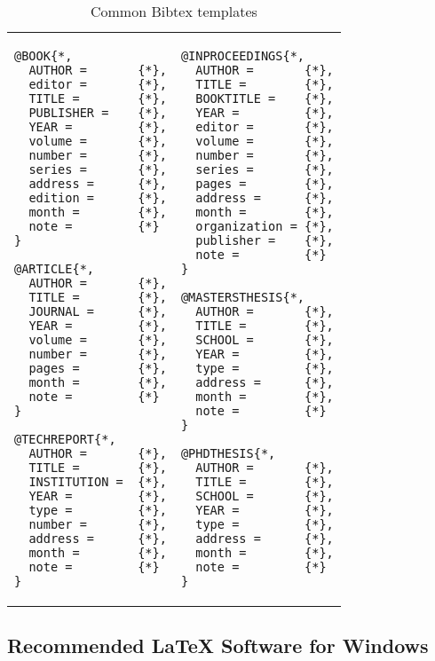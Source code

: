 \documentclass[10pt,a4paper,twoside,twocolumn]{article}
\begin{document}
\begin{table}
\newcommand{\mybibtabwidth}{0.45\columnwidth}
{\scriptsize
\begin{tabular}{ll}
  \begin{minipage}{\mybibtabwidth}
  \begin{verbatim}
@BOOK{*,
  AUTHOR =       {*},
  editor =       {*},
  TITLE =        {*},
  PUBLISHER =    {*},
  YEAR =         {*},
  volume =       {*},
  number =       {*},
  series =       {*},
  address =      {*},
  edition =      {*},
  month =        {*},
  note =         {*}
}

@ARTICLE{*,
  AUTHOR =       {*},
  TITLE =        {*},
  JOURNAL =      {*},
  YEAR =         {*},
  volume =       {*},
  number =       {*},
  pages =        {*},
  month =        {*},
  note =         {*}
}

@TECHREPORT{*,
  AUTHOR =       {*},
  TITLE =        {*},
  INSTITUTION =  {*},
  YEAR =         {*},
  type =         {*},
  number =       {*},
  address =      {*},
  month =        {*},
  note =         {*}
}
  \end{verbatim}
  \end{minipage} &

  \begin{minipage}{\mybibtabwidth}
  \begin{verbatim}
@INPROCEEDINGS{*,
  AUTHOR =       {*},
  TITLE =        {*},
  BOOKTITLE =    {*},
  YEAR =         {*},
  editor =       {*},
  volume =       {*},
  number =       {*},
  series =       {*},
  pages =        {*},
  address =      {*},
  month =        {*},
  organization = {*},
  publisher =    {*},
  note =         {*}
}

@MASTERSTHESIS{*,
  AUTHOR =       {*},
  TITLE =        {*},
  SCHOOL =       {*},
  YEAR =         {*},
  type =         {*},
  address =      {*},
  month =        {*},
  note =         {*}
}

@PHDTHESIS{*,
  AUTHOR =       {*},
  TITLE =        {*},
  SCHOOL =       {*},
  YEAR =         {*},
  type =         {*},
  address =      {*},
  month =        {*},
  note =         {*}
}
  \end{verbatim}
  \end{minipage} \\
  \end{tabular}
}
\caption{Common Bibtex templates}
\label{table:bibtextemplates}
\end{table}


\subsection{Recommended {\LaTeX} Software for Windows}
\end{document}

